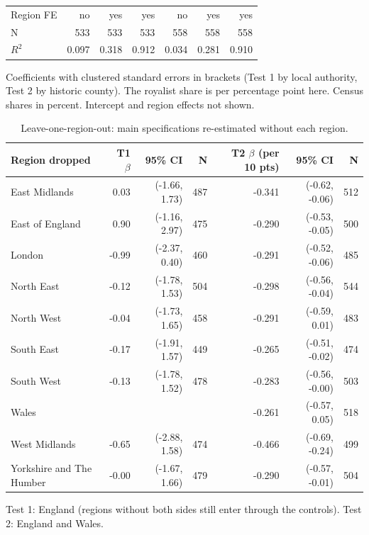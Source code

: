 \documentclass[11pt,a4paper]{article}
\begin{document}
\begin{table}[tbp]
\begin{tabular}{lrrrrrr}
\midrule Region FE & no & yes & yes & no & yes & yes\\
N & 533 & 533 & 533 & 558 & 558 & 558\\
$R^2$ & 0.097 & 0.318 & 0.912 & 0.034 & 0.281 & 0.910\\
\bottomrule\end{tabular}\par\vspace{0.3em}\parbox{0.92\textwidth}{\scriptsize Coefficients with clustered standard errors in brackets (Test 1 by local authority, Test 2 by historic county). The royalist share is per percentage point here. Census shares in percent. Intercept and region effects not shown.}\end{table}

\begin{table}[tbp]\centering\scriptsize\caption{Leave-one-region-out: main specifications re-estimated without each region.}\label{tab:loro}\begin{tabular}{lrrrrrr}\toprule Region dropped & T1 $\beta$ & 95\% CI & N & T2 $\beta$ (per 10 pts) & 95\% CI & N\\\midrule
East Midlands & 0.03 & (-1.66, 1.73) & 487 & -0.341 & (-0.62, -0.06) & 512\\
East of England & 0.90 & (-1.16, 2.97) & 475 & -0.290 & (-0.53, -0.05) & 500\\
London & -0.99 & (-2.37, 0.40) & 460 & -0.291 & (-0.52, -0.06) & 485\\
North East & -0.12 & (-1.78, 1.53) & 504 & -0.298 & (-0.56, -0.04) & 544\\
North West & -0.04 & (-1.73, 1.65) & 458 & -0.291 & (-0.59, 0.01) & 483\\
South East & -0.17 & (-1.91, 1.57) & 449 & -0.265 & (-0.51, -0.02) & 474\\
South West & -0.13 & (-1.78, 1.52) & 478 & -0.283 & (-0.56, -0.00) & 503\\
Wales & & & & -0.261 & (-0.57, 0.05) & 518\\
West Midlands & -0.65 & (-2.88, 1.58) & 474 & -0.466 & (-0.69, -0.24) & 499\\
Yorkshire and The Humber & -0.00 & (-1.67, 1.66) & 479 & -0.290 & (-0.57, -0.01) & 504\\
\bottomrule\end{tabular}\par\vspace{0.3em}\parbox{0.92\textwidth}{\scriptsize Test 1: England (regions without both sides still enter through the controls). Test 2: England and Wales.}\end{table}
\clearpage
\end{document}
